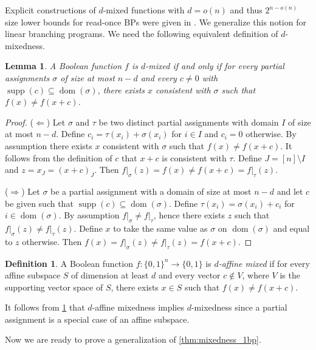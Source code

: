 \documentclass[a4paper,11pt,draft]{article}
\newtheorem{lemma}[theorem]{Lemma}
\theoremstyle{definition}
\newtheorem{definition}[theorem]{Definition}
\theoremstyle{remark}
\DeclareMathOperator{\supp}{supp}
\DeclareMathOperator{\dom}{dom}
\newcommand{\Q}{{\{0,1\}}}
\newcommand{\restr}[2]{\left.#1\right|_{#2}}
\begin{document}
Explicit constructions of $d$-mixed functions with $d = o(n)$ and thus $2^{n - o(n)}$ size lower bounds for read-once BPs were given in \cite{DBLP:journals/tcs/SavickyZ00,DBLP:conf/icalp/AndreevBCR99}. We generalize this notion for linear branching programs. We need the following equivalent definition of $d$-mixedness.

\begin{lemma}\label{lm:equiv_d-mixed}
  A Boolean function $f$ is $d$-mixed if and only if for every partial assignments $\sigma$ of size at most $n-d$ and every $c \neq 0$ with $\supp(c) \subseteq \dom(\sigma)$, there exists $x$ consistent with $\sigma$ such that $f(x) \neq f(x+c)$.
\end{lemma}
\begin{proof}
  ($\Leftarrow$) Let $\sigma$ and $\tau$ be two distinct partial assignments with domain $I$ of size at most $n - d$. Define $c_i = \tau(x_i) + \sigma(x_i)$ for $i \in I$ and $c_i = 0$ otherwise. By assumption there exists $x$ consistent with $\sigma$ such that $f(x) \ne f(x + c)$. It follows from the definition of $c$ that $x+c$ is consistent with $\tau$. Define $J = [n] \setminus I$ and $z = x_{J} = {(x+c)}_J$. Then $\restr{f}{\sigma}(z) = f(x) \neq f(x+c) = \restr{f}{\tau}(z)$.

  ($\Rightarrow$) Let $\sigma$ be a partial assignment with a domain of size at most $n - d$ and let $c$ be given such that $\supp(c) \subseteq \dom(\sigma)$. Define $\tau(x_i) = \sigma(x_i) + c_i$ for $i \in \dom(\sigma)$. By assumption $\restr{f}{\sigma} \neq \restr{f}{\tau}$, hence there exists $z$ such that $\restr{f}{\sigma}(z) \neq \restr{f}{\tau}(z)$. Define $x$ to take the same value as $\sigma$ on $\dom(\sigma)$ and equal to $z$ otherwise. Then $f(x) = \restr{f}{\sigma}(z) \neq \restr{f}{\tau}(z) = f(x+c)$.
\end{proof}

\begin{definition}
  A Boolean function $f\colon \Q^n \to \Q$ is \emph{$d$-affine mixed} if for every affine subspace $S$ of dimension at least $d$ and every vector $c \not\in V$, where $V$ is the supporting vector space of $S$, there exists $x \in S$ such that $f(x) \neq f(x+c)$.
\end{definition}

It follows from \cref{lm:equiv_d-mixed} that $d$-affine mixedness implies $d$-mixedness since a partial assignment is a special case of an affine subspace.

Now we are ready to prove a generalization of \cref{thm:mixedness_1bp}.
\end{document}
